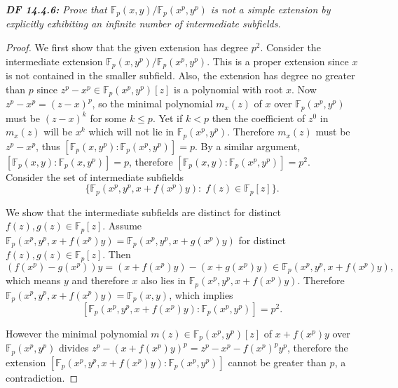 \documentclass{article}
\begin{document}
\it \textbf{DF 14.4.6:} Prove that
  $\mathbb{F}_p(x,y)/\mathbb{F}_p(x^p,y^p)$ is not a simple extension by
  explicitly exhibiting an infinite number of intermediate subfields.

  \begin{proof}
    We first show that the given extension has degree $p^2$. Consider the
    intermediate extension $\mathbb{F}_p(x,y^p)/\mathbb{F}_p(x^p,y^p)$.
    This is a proper extension since $x$ is not contained in the smaller
    subfield. Also, the extension has degree no greater than $p$ since
    $z^p-x^p\in \mathbb{F}_p(x^p,y^p)[z]$ is a polynomial with root $x$.
    Now $z^p-x^p=(z-x)^p$, so the minimal polynomial $m_x(z)$ of $x$ over
    $\mathbb{F}_p(x^p,y^p)$ must be $(z-x)^k$ for some $k\leq p$. Yet if
    $k<p$ then the coefficient of $z^0$ in $m_x(z)$ will be $x^k$ which
    will not lie in $\mathbb{F}_p(x^p,y^p)$. Therefore $m_x(z)$ must be
    $z^p-x^p$, thus $[\mathbb{F}_p(x,y^p):\mathbb{F}_p(x^p,y^p)]=p$. By a
    similar argument, $[\mathbb{F}_p(x,y):\mathbb{F}_p(x,y^p)]=p$,
    therefore $[\mathbb{F}_p(x,y):\mathbb{F}_p(x^p,y^p)]=p^2$. \\

    Consider the set of intermediate subfields
    \[\{\mathbb{F}_p(x^p,y^p,x+f(x^p)y):\; f(z)\in\mathbb{F}_p[z]\}.\]

    We show that the intermediate subfields are distinct for distinct
    $f(z),g(z)\in\mathbb{F}_p[z]$. Assume $\mathbb{F}_p(x^p,y^p,x+f(x^p)y)
    =\mathbb{F}_p(x^p,y^p,x+g(x^p)y)$ for distinct
    $f(z),g(z)\in\mathbb{F}_p[z]$. Then
    \[(f(x^p)-g(x^p))y =(x+f(x^p)y) -(x+g(x^p)y)
    \in\mathbb{F}_p(x^p,y^p,x+f(x^p)y),\]
    which means $y$ and therefore $x$ also lies in
    $\mathbb{F}_p(x^p,y^p,x+f(x^p)y)$. Therefore
    $\mathbb{F}_p(x^p,y^p,x+f(x^p)y) =\mathbb{F}_p(x,y)$, which implies
    \[[\mathbb{F}_p(x^p,y^p,x+f(x^p)y): \mathbb{F}_p(x^p,y^p)] =p^2.\]

    However the minimal polynomial $m(z)\in \mathbb{F}_p(x^p,y^p)[z]$ of
    $x+f(x^p)y$ over $\mathbb{F}_p(x^p,y^p)$ divides $z^p-(x+f(x^p)y)^p
    =z^p-x^p-f(x^p)^py^p$, therefore the extension
    $[\mathbb{F}_p(x^p,y^p,x+f(x^p)y): \mathbb{F}_p(x^p,y^p)]$ cannot be
    greater than $p$, a contradiction.
  \end{proof}
\end{document}
